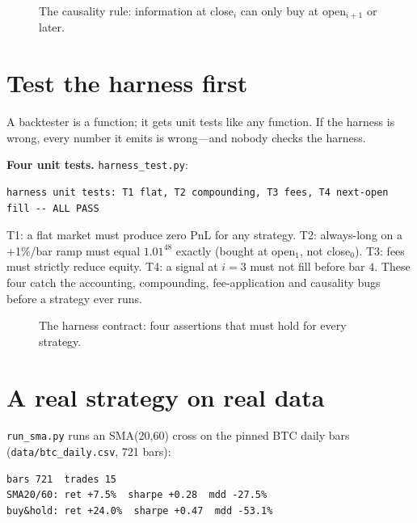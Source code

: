 \begin{figure}[htbp]\centering

\caption{The causality rule: information at close$_i$ can only buy at open$_{i+1}$ or later.}
\label{fig:fillrule}
\end{figure}

\section{Test the harness first}\label{sec:testharness}

A backtester is a function; it gets unit tests like any function. If the harness is wrong,
every number it emits is wrong---and nobody checks the harness.

\begin{example}\label{ex:unittest}
\textbf{Four unit tests.} \texttt{harness\_test.py}:
\begin{lstlisting}[numbers=none]
harness unit tests: T1 flat, T2 compounding, T3 fees, T4 next-open fill -- ALL PASS
\end{lstlisting}
\begin{solution}
T1: a flat market must produce zero PnL for any strategy. T2: always-long on a +1\%/bar
ramp must equal $1.01^{48}$ exactly (bought at open$_1$, not close$_0$). T3: fees must
strictly reduce equity. T4: a signal at $i{=}3$ must not fill before bar $4$. These four
catch the accounting, compounding, fee-application and causality bugs before a strategy
ever runs.
\end{solution}
\end{example}

\begin{figure}[htbp]\centering

\caption{The harness contract: four assertions that must hold for every strategy.}
\label{fig:tests}
\end{figure}

\section{A real strategy on real data}\label{sec:realbt}

\texttt{run\_sma.py} runs an SMA(20,60) cross on the pinned BTC daily bars
(\texttt{data/btc\_daily.csv}, 721 bars):
\begin{lstlisting}[numbers=none]
bars 721  trades 15
SMA20/60: ret +7.5%  sharpe +0.28  mdd -27.5%
buy&hold: ret +24.0%  sharpe +0.47  mdd -53.1%
\end{lstlisting}

